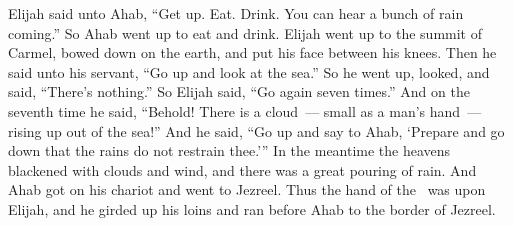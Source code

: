 \begin{inparaenum}
   Elijah said unto Ahab, ``Get up. Eat. Drink. You can hear a bunch of rain coming.''%
   So Ahab went up to eat and drink. Elijah went up to the summit of Carmel, bowed down on the earth, and put his face between his knees.%
   Then he said unto his servant, ``Go up and look at the sea.'' So he went up, looked, and said, ``There's nothing.'' So Elijah said, ``Go again seven times.''%
   And on the seventh time he said, ``Behold! There is a cloud~--- small as a man's hand~--- rising up out of the sea!'' And he said, ``Go up and say to Ahab, `Prepare and go down that the rains do not restrain thee.'''%
   In the meantime the heavens blackened with clouds and wind, and there was a great pouring of rain. And Ahab got on his chariot and went to Jezreel.%
   Thus the hand of the \lord\ was upon Elijah, and he girded up his loins and ran before Ahab to the border of Jezreel.%
\end{inparaenum}
